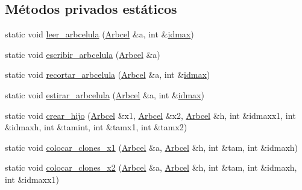 \subsection*{Métodos privados estáticos}
\begin{DoxyCompactItemize}
\item 
static void \hyperlink{class_organismo_a652f037263a8b6e429dfc50134860a35}{leer\-\_\-arbcelula} (\hyperlink{class_organismo_a6d28459b85f211994ba446ba304fa141}{Arbcel} \&a, int \&\hyperlink{class_organismo_ae64c038f5e9a19d5c7d858a2b0fb58ee}{idmax})
\item 
static void \hyperlink{class_organismo_a5a465f8d1bbdc11182102fa96eb1202e}{escribir\-\_\-arbcelula} (\hyperlink{class_organismo_a6d28459b85f211994ba446ba304fa141}{Arbcel} \&a)
\item 
static void \hyperlink{class_organismo_a5b15ef34617e0c3642b04b518be27962}{recortar\-\_\-arbcelula} (\hyperlink{class_organismo_a6d28459b85f211994ba446ba304fa141}{Arbcel} \&a, int \&\hyperlink{class_organismo_ae64c038f5e9a19d5c7d858a2b0fb58ee}{idmax})
\item 
static void \hyperlink{class_organismo_af2228bd5b25c4ca5924d30f075cb13fc}{estirar\-\_\-arbcelula} (\hyperlink{class_organismo_a6d28459b85f211994ba446ba304fa141}{Arbcel} \&a, int \&\hyperlink{class_organismo_ae64c038f5e9a19d5c7d858a2b0fb58ee}{idmax})
\item 
static void \hyperlink{class_organismo_a65395a14684f31fa2dadba6a3e037ad5}{crear\-\_\-hijo} (\hyperlink{class_organismo_a6d28459b85f211994ba446ba304fa141}{Arbcel} \&x1, \hyperlink{class_organismo_a6d28459b85f211994ba446ba304fa141}{Arbcel} \&x2, \hyperlink{class_organismo_a6d28459b85f211994ba446ba304fa141}{Arbcel} \&h, int \&idmaxx1, int \&idmaxh, int \&tamint, int \&tamx1, int \&tamx2)
\item 
static void \hyperlink{class_organismo_ae702339f0378d08af4f30729a4f2307c}{colocar\-\_\-clones\-\_\-x1} (\hyperlink{class_organismo_a6d28459b85f211994ba446ba304fa141}{Arbcel} \&a, \hyperlink{class_organismo_a6d28459b85f211994ba446ba304fa141}{Arbcel} \&h, int \&tam, int \&idmaxh)
\item 
static void \hyperlink{class_organismo_a2614d55b5ce001c216fc24c2eed9bfef}{colocar\-\_\-clones\-\_\-x2} (\hyperlink{class_organismo_a6d28459b85f211994ba446ba304fa141}{Arbcel} \&a, \hyperlink{class_organismo_a6d28459b85f211994ba446ba304fa141}{Arbcel} \&h, int \&tam, int \&idmaxh, int \&idmaxx1)
\end{DoxyCompactItemize}
